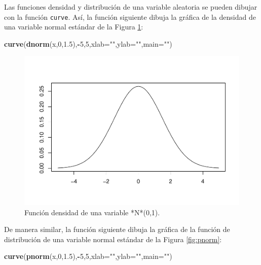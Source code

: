 \documentclass[
]{book}
\newenvironment{Shaded}{\begin{snugshade}}{\end{snugshade}}
\newcommand{\DataTypeTok}[1]{\textcolor[rgb]{0.13,0.29,0.53}{#1}}
\newcommand{\DecValTok}[1]{\textcolor[rgb]{0.00,0.00,0.81}{#1}}
\newcommand{\FloatTok}[1]{\textcolor[rgb]{0.00,0.00,0.81}{#1}}
\newcommand{\KeywordTok}[1]{\textcolor[rgb]{0.13,0.29,0.53}{\textbf{#1}}}
\newcommand{\NormalTok}[1]{#1}
\newcommand{\OperatorTok}[1]{\textcolor[rgb]{0.81,0.36,0.00}{\textbf{#1}}}
\newcommand{\StringTok}[1]{\textcolor[rgb]{0.31,0.60,0.02}{#1}}
\theoremstyle{definition}
\theoremstyle{definition}
\theoremstyle{definition}
\theoremstyle{remark}
\begin{document}
Las funciones densidad y distribución de una variable aleatoria se pueden dibujar con la función \texttt{curve}. Así, la función siguiente dibuja la gráfica de la densidad de una variable normal estándar de la Figura \ref{fig:dnorm}:

\begin{Shaded}
\begin{Highlighting}[]
\KeywordTok{curve}\NormalTok{(}\KeywordTok{dnorm}\NormalTok{(x,}\DecValTok{0}\NormalTok{,}\FloatTok{1.5}\NormalTok{),}\OperatorTok{{-}}\DecValTok{5}\NormalTok{,}\DecValTok{5}\NormalTok{,}\DataTypeTok{xlab=}\StringTok{""}\NormalTok{,}\DataTypeTok{ylab=}\StringTok{""}\NormalTok{,}\DataTypeTok{main=}\StringTok{""}\NormalTok{)}
\end{Highlighting}
\end{Shaded}

\begin{figure}

{\centering \includegraphics[width=0.9\linewidth]{09chap08_Distribuciones_files/figure-latex/dnorm-1} 

}

\caption{Función densidad de una variable *N*(0,1).}\label{fig:dnorm}
\end{figure}

De manera similar, la función siguiente dibuja la gráfica de la función de distribución de una variable normal estándar de la Figura \ref{fig:pnorm}:

\begin{Shaded}
\begin{Highlighting}[]
\KeywordTok{curve}\NormalTok{(}\KeywordTok{pnorm}\NormalTok{(x,}\DecValTok{0}\NormalTok{,}\FloatTok{1.5}\NormalTok{),}\OperatorTok{{-}}\DecValTok{5}\NormalTok{,}\DecValTok{5}\NormalTok{,}\DataTypeTok{xlab=}\StringTok{""}\NormalTok{,}\DataTypeTok{ylab=}\StringTok{""}\NormalTok{,}\DataTypeTok{main=}\StringTok{""}\NormalTok{)}
\end{Highlighting}
\end{Shaded}
\end{document}
